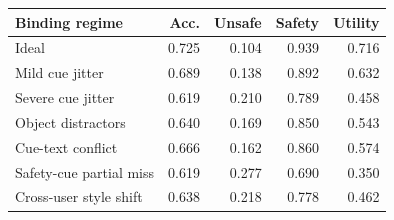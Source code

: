 \begin{tabular}{lrrrr}
\toprule
Binding regime & Acc. & Unsafe & Safety & Utility \\
\midrule
Ideal & 0.725 & 0.104 & 0.939 & 0.716 \\
Mild cue jitter & 0.689 & 0.138 & 0.892 & 0.632 \\
Severe cue jitter & 0.619 & 0.210 & 0.789 & 0.458 \\
Object distractors & 0.640 & 0.169 & 0.850 & 0.543 \\
Cue-text conflict & 0.666 & 0.162 & 0.860 & 0.574 \\
Safety-cue partial miss & 0.619 & 0.277 & 0.690 & 0.350 \\
Cross-user style shift & 0.638 & 0.218 & 0.778 & 0.462 \\
\bottomrule
\end{tabular}
